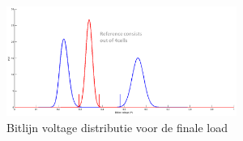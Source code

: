 \begin{figure}[!h]
  \centering
  \includegraphics[width=0.67\textwidth]{../fig/hfdst-last-var2.png}
  \caption{Bitlijn voltage distributie voor de finale load}
  \label{fig:distswitch}
\end{figure}